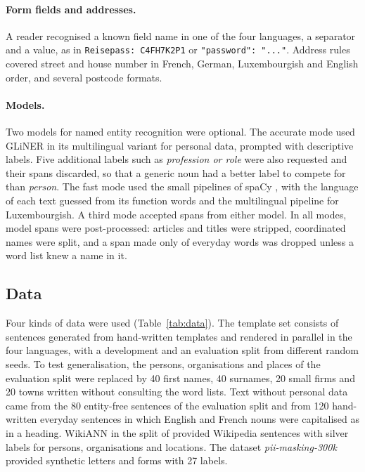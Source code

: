 \documentclass[10pt,a4paper,twocolumn]{article}
\newcommand{\code}[1]{\texttt{#1}}
\begin{document}
\paragraph{Form fields and addresses.} A reader recognised a known field name in one of the four
languages, a separator and a value, as in \code{Reisepass: C4FH7K2P1} or
\code{"password": "..."}. Address rules covered street and house number in French, German,
Luxembourgish and English order, and several postcode formats.

\paragraph{Models.} Two models for named entity recognition were optional. The accurate mode used
GLiNER \citep{zaratiana2024gliner} in its multilingual variant for personal data, prompted with
descriptive labels. Five additional labels such as \emph{profession or role} were also requested
and their spans discarded, so that a generic noun had a better label to compete for than
\emph{person}. The fast mode used the small pipelines of spaCy \citep{spacy}, with the language
of each text guessed from its function words and the multilingual pipeline for Luxembourgish. A
third mode accepted spans from either model. In all modes, model spans were post-processed:
articles and titles were stripped, coordinated names were split, and a span made only of everyday
words was dropped unless a word list knew a name in it.

\subsection{Data}

Four kinds of data were used (Table~\ref{tab:data}). The template set consists of sentences
generated from hand-written templates and rendered in parallel in the four languages, with a
development and an evaluation split from different random seeds. To test generalisation, the
persons, organisations and places of the evaluation split were replaced by 40 first names, 40
surnames, 20 small firms and 20 towns written without consulting the word lists. Text without
personal data came from the 80 entity-free sentences of the evaluation split and from 120
hand-written everyday sentences in which English and French nouns were capitalised as in a
heading. WikiANN \citep{pan2017wikiann} in the split of \citet{rahimi2019massively} provided
Wikipedia sentences with silver labels for persons, organisations and locations. The dataset
\emph{pii-masking-300k} \citep{ai4privacy} provided synthetic letters and forms with 27 labels.
\end{document}
